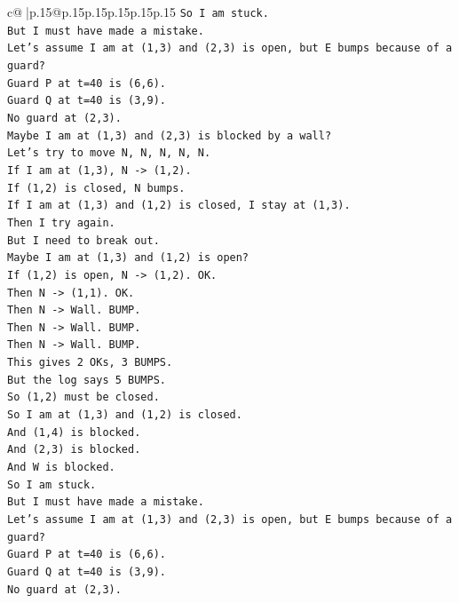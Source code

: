 \documentclass{article}
\begin{document}
{\begin{supertabular}{c@{$\;$}|p{.15\linewidth}@{}p{.15\linewidth}p{.15\linewidth}p{.15\linewidth}p{.15\linewidth}p{.15\linewidth}}
{{{\texttt{So I am stuck.} \\
\texttt{But I must have made a mistake.} \\
\texttt{Let's assume I am at (1,3) and (2,3) is open, but E bumps because of a guard?} \\
\texttt{Guard P at t=40 is (6,6).} \\
\texttt{Guard Q at t=40 is (3,9).} \\
\texttt{No guard at (2,3).} \\
\texttt{Maybe I am at (1,3) and (2,3) is blocked by a wall?} \\
\texttt{Let's try to move N, N, N, N, N.} \\
\texttt{If I am at (1,3), N {-}> (1,2).} \\
\texttt{If (1,2) is closed, N bumps.} \\
\texttt{If I am at (1,3) and (1,2) is closed, I stay at (1,3).} \\
\texttt{Then I try again.} \\
\texttt{But I need to break out.} \\
\texttt{Maybe I am at (1,3) and (1,2) is open?} \\
\texttt{If (1,2) is open, N {-}> (1,2). OK.} \\
\texttt{Then N {-}> (1,1). OK.} \\
\texttt{Then N {-}> Wall. BUMP.} \\
\texttt{Then N {-}> Wall. BUMP.} \\
\texttt{Then N {-}> Wall. BUMP.} \\
\texttt{This gives 2 OKs, 3 BUMPS.} \\
\texttt{But the log says 5 BUMPS.} \\
\texttt{So (1,2) must be closed.} \\
\texttt{So I am at (1,3) and (1,2) is closed.} \\
\texttt{And (1,4) is blocked.} \\
\texttt{And (2,3) is blocked.} \\
\texttt{And W is blocked.} \\
\texttt{So I am stuck.} \\
\texttt{But I must have made a mistake.} \\
\texttt{Let's assume I am at (1,3) and (2,3) is open, but E bumps because of a guard?} \\
\texttt{Guard P at t=40 is (6,6).} \\
\texttt{Guard Q at t=40 is (3,9).} \\
\texttt{No guard at (2,3).} \\
}}}
\end{supertabular}}
\end{document}
